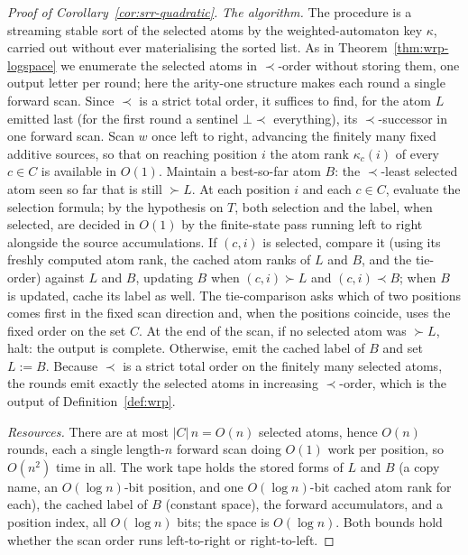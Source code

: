\documentclass[11pt]{article}
\theoremstyle{definition}
\begin{document}
\begin{proof}[Proof of Corollary~\ref{cor:srr-quadratic}]
\vspace{0.5em}
\noindent\emph{The algorithm.}
The procedure is a streaming stable sort of the selected atoms by the
weighted-automaton key $\kappa$, carried out without ever materialising the
sorted list.  As in Theorem~\ref{thm:wrp-logspace} we enumerate the selected
atoms in $\prec$-order without storing them, one output letter per round; here
the arity-one structure makes each round a single forward scan.  Since $\prec$ is a
strict total order, it suffices to find, for the atom $L$ emitted last (for the
first round a sentinel $\bot\prec$ everything), its $\prec$-successor in one
forward scan.  Scan $w$ once left to right, advancing the finitely many fixed
additive sources, so that on reaching position $i$ the atom rank $\kappa_c(i)$
of every $c\in C$ is available in $O(1)$.  Maintain a best-so-far atom $B$: the
$\prec$-least selected atom seen so far that is still $\succ L$.  At each
position $i$ and each $c\in C$, evaluate the selection formula; by the hypothesis on
$T$, both selection and the label, when selected, are decided in $O(1)$ by the
finite-state pass running left to right alongside the source accumulations.  If $(c,i)$ is
selected, compare it (using its freshly computed atom rank, the cached atom ranks of
$L$ and $B$, and the tie-order) against $L$ and $B$, updating $B$ when
$(c,i)\succ L$ and $(c,i)\prec B$; when $B$ is updated, cache its label as
well.  The tie-comparison asks which of two positions comes first in the fixed
scan direction and, when the positions coincide, uses the fixed order on
the set $C$.  At the end of the scan, if no selected atom was $\succ L$, halt:
the output is complete.  Otherwise, emit the cached label of $B$ and set
$L:=B$.  Because $\prec$ is a strict total order
on the finitely many selected atoms, the rounds emit exactly the selected atoms
in increasing $\prec$-order, which is the output of Definition~\ref{def:wrp}.

\vspace{0.5em}
\noindent\emph{Resources.}
There are at most $|C|\,n=O(n)$ selected atoms, hence $O(n)$ rounds, each a
single length-$n$ forward scan doing $O(1)$ work per position, so $O(n^2)$ time
in all.  The work tape holds the stored forms of $L$ and $B$ (a copy name, an
$O(\log n)$-bit position, and one $O(\log n)$-bit cached atom rank for each),
the cached
label of $B$ (constant space), the forward accumulators, and a position index,
all $O(\log n)$ bits; the space is
$O(\log n)$.  Both bounds hold whether the scan order runs left-to-right or
right-to-left.
\end{proof}
\end{document}
